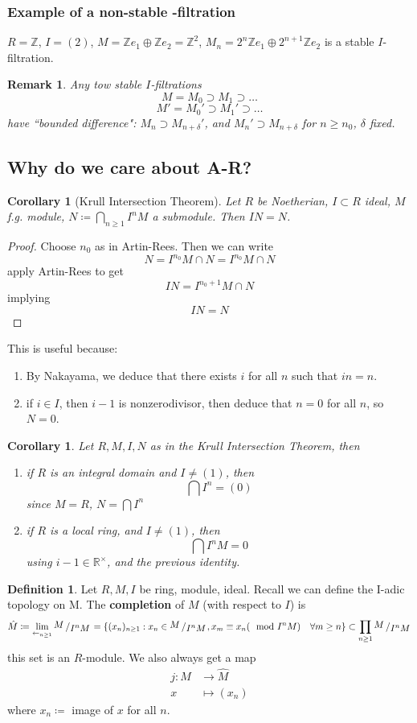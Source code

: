 \documentclass[12pt]{article}
\newcommand{\z}{\mathbb{Z}}
\newcommand{\bigslant}[2]{{\raisebox{.2em}{$#1$}\left/\raisebox{-.2em}{$#2$}\right.}}
\newcommand{\mapping}[5]{\begin{align*}
#1\colon #2 &\to #3\\
#4 & \mapsto #5
\end{align*}}
\def\r{\mathbb{R}}
\newtheorem{corollary}[theorem]{Corollary}
\newtheorem{remark}[theorem]{Remark}
\theoremstyle{definition}
\newtheorem{definition}[theorem]{Definition}
\begin{document}
\subsubsection*{Example of a non-stable -filtration}
$R = \z$, $I = (2)$, $M = \z e_1 \oplus \z e_2 = \z^2$, $M_n = 2^n\z e_1 \oplus 2^{n+1} \z e_2$ is a stable $I$-filtration.

\begin{remark}
Any tow stable $I$-filtrations 
\[
M = M_0 \supset M_1 \supset \dots
\]
\[
M' = M_0' \supset M_1' \supset \dots
\]
have ``bounded difference": $M_n \supset M_{n+\delta }'$, and $M_n' \supset M_{n+\delta}$ for $n\geq n_0$, $\delta $ fixed.
\end{remark}
\subsection*{Why do we care about A-R? }
\begin{corollary}[Krull Intersection Theorem]
Let $R$ be Noetherian, $I\subset R$ ideal, $M$ f.g. module, $N \coloneqq \bigcap_{n\geq 1}I^nM$ a submodule. Then $IN=N$.
\end{corollary}
\begin{proof}
Choose $n_0$ as in Artin-Rees. Then we can write 
\[
N = I^{n_0}M \cap N = I^{n_0}M\cap N
\]
apply Artin-Rees to get
\[
IN = I^{n_0+1}M \cap N
\]
implying
\[
IN = N
\]
\end{proof}
This is useful because:
\begin{enumerate}
    \item By Nakayama, we deduce that there exists $i$ for all $n$ such that $in=n$.
    \item if $i\in I$, then $i-1$ is nonzerodivisor, then deduce that $n=0$ for all $n$, so $N=0$.
\end{enumerate}
\begin{corollary}
Let $R,M,I,N$ as in the Krull Intersection Theorem, then
\begin{enumerate}
    \item if $R$ is an integral domain and $I\neq  (1)$, then 
    \[
    \bigcap I^n = (0)
    \]
    since $M=R$, $N=\bigcap I^n$
    \item if $R$ is a local ring, and $I\neq (1)$, then
    \[
    \bigcap I^nM =0
    \]
    using $i-1 \in \r^\times$, and the previous identity.
\end{enumerate}
\end{corollary}
\begin{definition}
Let $R,M,I$ be ring, module, ideal. Recall we can define the I-adic topology on M. The \textbf{completion} of $M$ (with respect to $I$) is
\[
\hat{M} \coloneqq \lim_{\leftarrow_{n\geq 1}} \bigslant{M}{I^nM} = \{(x_n)_{n\geq 1}: x_n\in \bigslant{M}{I^nM}, x_m \equiv x_n (\mod I^nM) \quad  \forall m\geq n\} \subset \prod_{n\geq 1} \bigslant{M}{I^nM}
\]
this set is an $R$-module. We also always get a map
\[
\mapping{j}{M}{\hat{M}}{x}{(x_n)}
\]
where $x_n \coloneqq$ image of $x$ for all $n$.
\end{definition}
\end{document}

